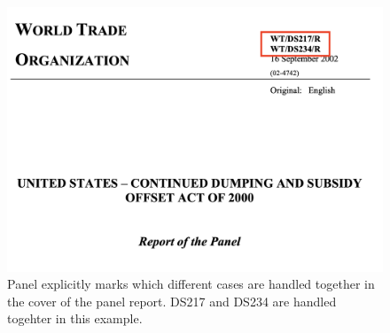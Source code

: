 \begin{figure}[h]
    \centering
    \includegraphics[scale=0.35]{Data/pngs/linked_cases.png}
    \caption{
        Panel explicitly marks which different cases are handled together in the cover of the panel report. DS217 and DS234 are handled togehter in this example.
        }
    \label{fig:linked-cases}
\end{figure}



